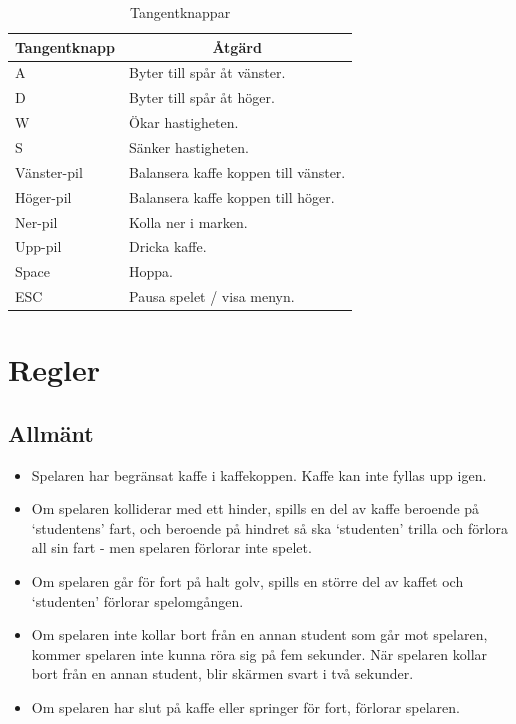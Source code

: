 \documentclass{template}
\begin{document}
\begin{table}[]
    \centering
    \caption{Tangentknappar}
    \label{mekanik}
    \begin{tabular}{|l|l|}
        \hline
        \multicolumn{1}{|c|}{\textbf{Tangentknapp}} & \multicolumn{1}{c|}{\textbf{Åtgärd}} \\ \hline
        A & Byter till spår åt vänster. \\ \hline
        D & Byter till spår åt höger. \\ \hline
        W & Ökar hastigheten. \\ \hline
        S & Sänker hastigheten. \\ \hline                
        Vänster-pil & Balansera kaffe koppen till vänster. \\ \hline
        Höger-pil & Balansera kaffe koppen till höger. \\ \hline
        Ner-pil & Kolla ner i marken. \\ \hline
        Upp-pil & Dricka kaffe. \\ \hline        
        Space & Hoppa. \\ \hline
        ESC & Pausa spelet / visa menyn. \\ \hline
    \end{tabular}
\end{table}

\section{Regler}
\subsection{Allmänt}
\begin{itemize}
\item Spelaren har begränsat kaffe i kaffekoppen. Kaffe kan inte fyllas upp igen.

\item Om spelaren kolliderar med ett hinder, spills en del av kaffe beroende på `studentens' fart, och beroende på hindret så ska `studenten' trilla och förlora all sin fart - men spelaren förlorar inte spelet.

\item Om spelaren går för fort på halt golv, spills en större del av kaffet och `studenten' förlorar spelomgången.

\item Om spelaren inte kollar bort från en annan student som går mot spelaren, kommer spelaren inte kunna röra sig på fem sekunder. När spelaren kollar bort från en annan student, blir skärmen svart i två sekunder.
\item Om spelaren har slut på kaffe eller springer för fort, förlorar spelaren.

\end{itemize}
\end{document}
